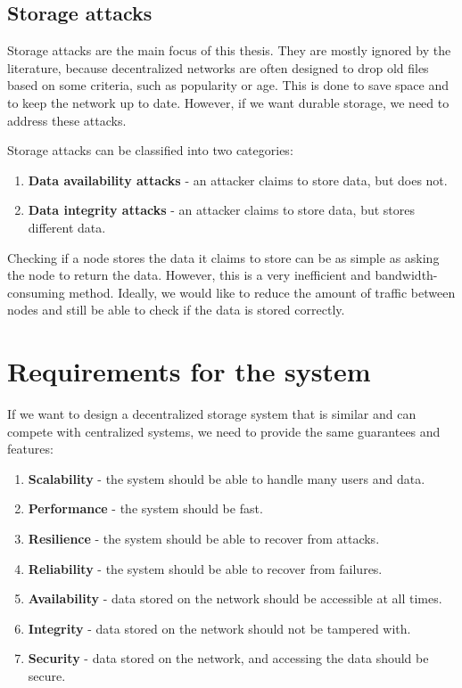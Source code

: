 \subsection{Storage attacks}
\label{section:storage-attacks}

Storage attacks are the main focus of this thesis.
They are mostly ignored by the literature, because decentralized networks are often designed to
drop old files based on some criteria, such as popularity or age.
This is done to save space and to keep the network up to date.
However, if we want durable storage, we need to address these attacks.

Storage attacks can be classified into two categories:
\begin{enumerate}
    \item \textbf{Data availability attacks} - an attacker claims to store data, but does not.
    \item \textbf{Data integrity attacks} - an attacker claims to store data, but stores different data.
\end{enumerate}

Checking if a node stores the data it claims to store can be as simple as asking the node to return the data.
However, this is a very inefficient and bandwidth-consuming method.
Ideally, we would like to reduce the amount of traffic between nodes and still be able to check
if the data is stored correctly.

\section{Requirements for the system}

If we want to design a decentralized storage system that is similar and can compete with centralized systems,
we need to provide the same guarantees and features:
\begin{enumerate}
    \item \textbf{Scalability} - the system should be able to handle many users and data.
    \item \textbf{Performance} - the system should be fast.
    \item \textbf{Resilience} - the system should be able to recover from attacks.
    \item \textbf{Reliability} - the system should be able to recover from failures.
    \item \textbf{Availability} - data stored on the network should be accessible at all times.
    \item \textbf{Integrity} - data stored on the network should not be tampered with.
    \item \textbf{Security} - data stored on the network, and accessing the data should be secure.
\end{enumerate}

